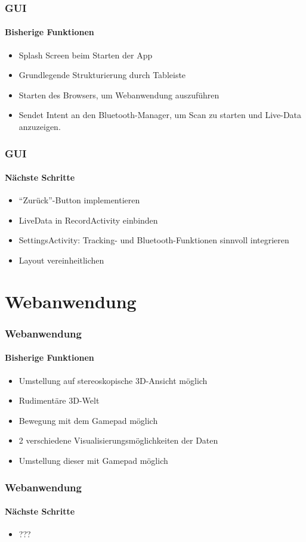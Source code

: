 \documentclass{beamer}
\begin{document}
\begin{frame}
\frametitle{GUI}
\framesubtitle{Bisherige Funktionen}
\begin{itemize}
  \item Splash Screen beim Starten der App
  \item Grundlegende Strukturierung durch Tableiste 
  \item Starten des Browsers, um Webanwendung auszuf\"uhren
  \item Sendet Intent an den Bluetooth-Manager, um Scan zu starten und Live-Data anzuzeigen.
\end{itemize}
\end{frame}

\begin{frame}
\frametitle{GUI}
\framesubtitle{N\"achste Schritte}
\begin{itemize}
  \item ``Zur\"uck''-Button implementieren 
  \item LiveData in RecordActivity einbinden
  \item SettingsActivity: Tracking- und Bluetooth-Funktionen sinnvoll integrieren
  \item Layout vereinheitlichen
\end{itemize}
\end{frame}

\section{Webanwendung}

\begin{frame}
\frametitle{Webanwendung}
\framesubtitle{Bisherige Funktionen}
\begin{itemize}
  \item Umstellung auf stereoskopische 3D-Ansicht m\"oglich
  \item Rudiment\"are 3D-Welt
  \item Bewegung mit dem Gamepad m\"oglich
  \item 2 verschiedene Visualisierungsm\"oglichkeiten der Daten
  \item Umstellung dieser mit Gamepad m\"oglich
\end{itemize}
\end{frame}

\begin{frame}
\frametitle{Webanwendung}
\framesubtitle{N\"achste Schritte}
\begin{itemize}
  \item ???
\end{itemize}
\end{frame}
\end{document}
